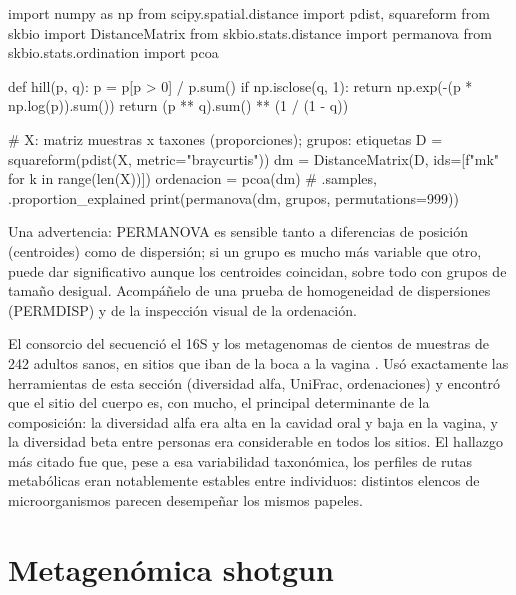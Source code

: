 \begin{codigo}[diversidad.py]
import numpy as np
from scipy.spatial.distance import pdist, squareform
from skbio import DistanceMatrix
from skbio.stats.distance import permanova
from skbio.stats.ordination import pcoa

def hill(p, q):
    p = p[p > 0] / p.sum()
    if np.isclose(q, 1):
        return np.exp(-(p * np.log(p)).sum())
    return (p ** q).sum() ** (1 / (1 - q))

# X: matriz muestras x taxones (proporciones); grupos: etiquetas
D = squareform(pdist(X, metric="braycurtis"))
dm = DistanceMatrix(D, ids=[f"m{k}" for k in range(len(X))])
ordenacion = pcoa(dm)                   # .samples, .proportion_explained
print(permanova(dm, grupos, permutations=999))
\end{codigo}

Una advertencia: PERMANOVA es sensible tanto a diferencias de posición (centroides) como de dispersión; si un grupo es mucho más variable que otro, puede dar significativo aunque los centroides coincidan, sobre todo con grupos de tamaño desigual. Acompáñelo de una prueba de homogeneidad de dispersiones (PERMDISP) y de la inspección visual de la ordenación.

\begin{historia}
El consorcio del  secuenció el 16S y los metagenomas de cientos de muestras de 242 adultos sanos, en sitios que iban de la boca a la vagina \parencite{c14-hmp2012}. Usó exactamente las herramientas de esta sección (diversidad alfa, UniFrac, ordenaciones) y encontró que el sitio del cuerpo es, con mucho, el principal determinante de la composición: la diversidad alfa era alta en la cavidad oral y baja en la vagina, y la diversidad beta entre personas era considerable en todos los sitios. El hallazgo más citado fue que, pese a esa variabilidad taxonómica, los perfiles de rutas metabólicas eran notablemente estables entre individuos: distintos elencos de microorganismos parecen desempeñar los mismos papeles.
\end{historia}

\section{Metagenómica shotgun}\label{sec:14-shotgun}

